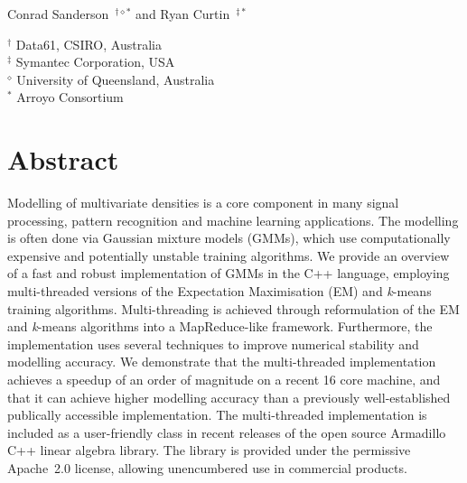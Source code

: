 \documentclass[10pt,a4paper]{article}
\begin{document}
\pagestyle{empty}
\lhead{}
\chead{}
\rhead{}
\lfoot{}
\cfoot{}
\rfoot{}



\begin{center}
{\Large\bf\doctitle}
\end{center}
\vspace{1ex}
\begin{center}

\begin{minipage}{0.5\textwidth}
{\large Conrad Sanderson~{$^{\dagger\diamond\ast}$} and Ryan Curtin~{$^{\ddagger\ast}$}}\\

\begin{small}
{$^\dagger$}  Data61, CSIRO, Australia\\
{$^\ddagger$} Symantec Corporation, USA\\
{$^\diamond$} University of Queensland, Australia\\
{$^\ast$}     Arroyo Consortium
\end{small}
\end{minipage}
\end{center}

\vspace{2ex}

\section*{Abstract}

Modelling of multivariate densities is a core component in many signal processing, pattern recognition and machine learning applications.
The modelling is often done via Gaussian mixture models (GMMs), which use computationally expensive and potentially unstable training algorithms.
We provide an overview of a fast and robust implementation of GMMs in the C++ language,
employing multi-threaded versions of the Expectation Maximisation (EM) and \mbox{{\it k}-means} training algorithms.
Multi-threading is achieved through reformulation of the EM and \mbox{{\it k}-means} algorithms into a MapReduce-like framework.
Furthermore, the implementation uses several techniques to improve numerical stability and modelling accuracy.
We demonstrate that the multi-threaded implementation achieves a speedup of an order of magnitude on a recent 16 core machine,
and that it can achieve higher modelling accuracy than a previously well-established publically accessible implementation.
The multi-threaded implementation is included as a user-friendly class in recent releases of the open source Armadillo C++ linear algebra library.
The library is provided under the permissive Apache~2.0 license, allowing unencumbered use in commercial products.
\end{document}
